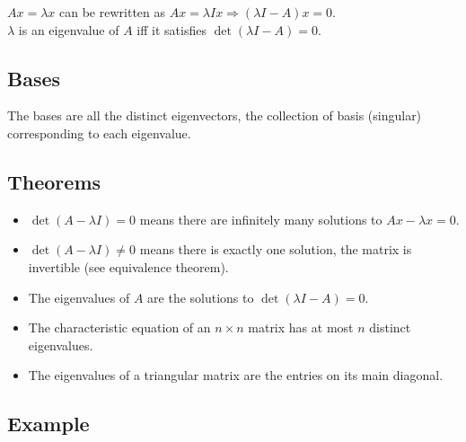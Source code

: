 \documentclass[12pt]{article}
\begin{document}
$Ax = \lambda x$ can be rewritten as $Ax = \lambda Ix \Rightarrow (\lambda I - A)x = 0$.\\
$\lambda$ is an eigenvalue of $A$ iff it satisfies $\det(\lambda I - A) = 0$.


\subsection{Bases}

The bases are all the distinct eigenvectors, the collection of basis (singular) corresponding to each eigenvalue.


\subsection{Theorems}

\begin{itemize}
    \item $\det(A - \lambda I) = 0$ means there are infinitely many solutions to $Ax - \lambda x = 0$.
    \item $\det(A - \lambda I) \neq 0$ means there is exactly one solution, the matrix is invertible (see equivalence theorem).
    \item The eigenvalues of $A$ are the solutions to $\det(\lambda I - A) = 0$.
    \item The characteristic equation of an $n\times n$ matrix has at most $n$ distinct eigenvalues.
    \item The eigenvalues of a triangular matrix are the entries on its main diagonal.
\end{itemize}


\subsection{Example}
\end{document}
